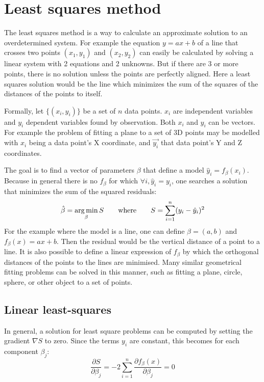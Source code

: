 \section{Least squares method}
The least squares method is a way to calculate an approximate solution to an overdetermined system. For example the equation $y = ax + b$ of a line that crosses two points $(x_1, y_1)$ and $(x_2, y_2)$ can easily be calculated by solving a linear system with 2 equations and 2 unknowns. But if there are 3 or more points, there is no solution unless the points are perfectly aligned. Here a least squares solution would be the line which minimizes the sum of the squares of the distances of the points to itself.

Formally, let $\{ (x_i, y_i) \}$ be a set of $n$ data points. $x_i$ are independent variables and $y_i$ dependent variables found by observation. Both $x_i$ and $y_i$ can be vectors. For example the problem of fitting a plane to a set of 3D points may be modelled with $x_i$ being a data point's X coordinate, and $\vec{y_i}$ that data point's Y and Z coordinates.

The goal is to find a vector of parameters $\beta$ that define a model $\hat{y}_i = f_{\beta}(x_i)$. Because in general there is no $f_{\beta}$ for which $\forall i, \hat{y}_i = y_i$, one searches a solution that minimizes the sum of the squared residuals:
\begin{equation}
\hat{\beta} = \operatorname*{arg\,min}_{\beta} S \hspace{7mm} \text{where} \hspace{7mm} S = \sum_{i=1}^{n} (y_i - \hat{y}_i)^2
\end{equation}
For the example where the model is a line, one can define $\beta = (a, b)$ and $f_{\beta}(x) = ax + b$. Then the residual would be the vertical distance of a point to a line. It is also possible to define a linear expression of $f_{\beta}$ by which the orthogonal distances of the points to the lines are minimised. Many similar geometrical fitting problems can be solved in this manner, such as fitting a plane, circle, sphere, or other object to a set of points. \cite{Eber1999}

\subsection{Linear least-squares}
In general, a solution for least square problems can be computed by setting the gradient $\nabla S$ to zero. Since the terms $y_i$ are constant, this becomes for each component $\beta_j$:
\begin{equation} \label{eq:lsq_sol}
\frac{\partial S }{\partial \beta_j} = -2 \sum_{i=1}^{n} \frac{\partial f_{\beta}(x)}{\partial \beta_j} = 0
\end{equation}

